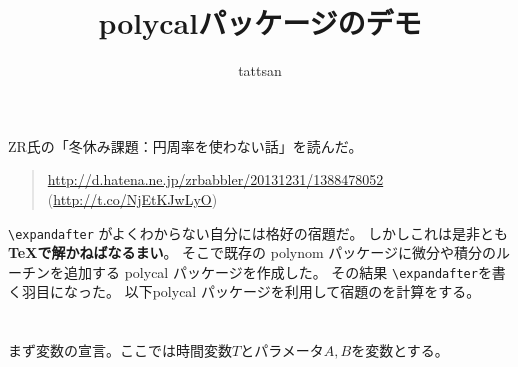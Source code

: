 \documentclass{jsarticle}
\title{\textsf{polycal}パッケージのデモ}\author{tattsan}\date{}
\begin{document}
\maketitle

\section{}
ZR氏の「冬休み課題：円周率を使わない話」を読んだ。
\begin{quote}
  \url{http://d.hatena.ne.jp/zrbabbler/20131231/1388478052}
  (\url{http://t.co/NjEtKJwLyO})
\end{quote}
\verb+\expandafter+  がよくわからない自分には格好の宿題だ。
しかしこれは是非とも\textbf{\TeX で解かねばなるまい}。
そこで既存の \textsf{polynom} パッケージに微分や積分のルーチンを追加する
\textsf{polycal} パッケージを作成した。
その結果 \verb|\expandafter|を書く羽目になった。
以下\textsf{polycal} パッケージを利用して宿題のを計算をする。
\section{}
まず変数の宣言。ここでは時間変数$T$とパラメータ$A,B$を変数とする。
\end{document}
